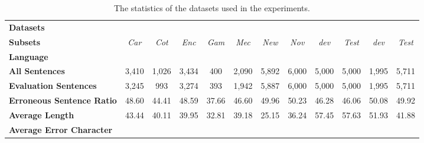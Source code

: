 \begin{table*}[p!]
    \centering
    \setlength{\tabcolsep}{2.1pt}
    \begin{NiceTabular}{p{12em}ccccccc|cc|cc}
        \toprule
        \textbf{Datasets}                 &  &                 &              &                 &              &              &              &  &               &  &               \\
        \textbf{Subsets}                  & \textit{Car}                   & \textit{Cot}    & \textit{Enc} & \textit{Gam}    & \textit{Mec} & \textit{New} & \textit{Nov} & \textit{dev}                     & \textit{Test} & \textit{dev}                  & \textit{Test} \\
        \midrule
        \textbf{Language}                 &        &                 &              &                 &              &              &              &                                  &               &                               &               \\
        \midrule
        \textbf{All Sentences}            & 3,410                          & 1,026           & 3,434        & \phantom{0,}400 & 2,090        & 5,892        & 6,000        & 5,000                            & 5,000         & 1,995                         & 5,711         \\
        \textbf{Evaluation Sentences}     & 3,245                          & \phantom{0,}993 & 3,274        & \phantom{0,}393 & 1,942        & 5,887        & 6,000        & 5,000                            & 5,000         & 1,995                         & 5,711         \\
        \textbf{Erroneous Sentence Ratio} & 48.60                          & 44.41           & 48.59        & 37.66           & 46.60        & 49.96        & 50.23        & 46.28                            & 46.06         & 50.08                         & 49.92         \\
        \textbf{Average Length}           & 43.44                          & 40.11           & 39.95        & 32.81           & 39.18        & 25.15        & 36.24        & 57.45                            & 57.63         & 51.93                         & 41.88         \\
        \textbf{Average Error Character}  &                         &          &       &          &       &       &       &                           &        &                        &        \\
        \bottomrule
    \end{NiceTabular}
    \caption{
        The statistics of the datasets used in the experiments.
    }
    \label{tab:dataset_statistics}
\end{table*}
